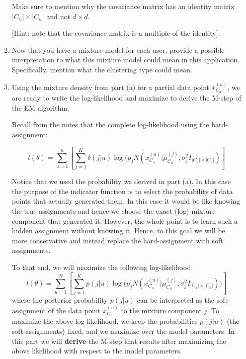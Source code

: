 \begin{enumerate}
\begin{enumerate}
Make sure to mention why the covariance matrix has an identity matrix $ |C_u| \times |C_u| $ and not $ d \times d $.
 
 [Hint: note that the covariance matrix is a multiple of the identity].

 
 \item Now that you have a mixture model for each user, provide a possible interpretation to what this mixture model could mean in this application. Specifically, mention what the clustering type could mean.

\item Using the mixture density from part (a) for a partial data point $x^{(u)}_{C_u}$, we are ready to write the log-likelihood and maximize to derive the M-step of the EM algorithm. 

\color{blue}
Recall from the notes that the complete log-likelihood using the hard-assignment:

$$ l(\theta) = \sum^n_{u=1} \left[ \sum^{K}_{j=1} \delta(j|u) \log( p_j N(x^{(u)}_{C_u} | \mu^{(j)}_{C_u}, \sigma^2_j I_{|C_u| \times |C_u|}) \right]$$

Notice that we used the probability we derived in part (a). In this case the purpose of the indicator function is to select the probability of data points that actually generated them. In this case it would be like knowing the true assignments and hence we choose the exact (log) mixture component that generated it. However, the whole point is to learn such a hidden assignment without knowing it. Hence, to this goal we will be more conservative and instead replace the hard-assignment with soft assignments.
\color{black}

To that end, we will maximize the following log-likelihood:
$$ l(\theta) = \sum_{u=1}^N \left[ \sum^{K}_{j=1} p(j|u) \log\bigl( p_j N(x^{(u)}_{C_u} | \mu^{(j)}_{C_u}, \sigma^2_j I_{|C_u| \times |C_u|} ) \bigr) \right]$$
where the posterior probability $p(j|u)$ can be interpreted as the soft-assignment of the data point $x^{(u)}_{C_u}$ to the mixture component $j$. To maximize the above log-likelihood, we keep the probabilities $p(j|u)$ (the soft-assignments) fixed, and we maximize over the model parameters. In this part we will \textbf{derive} the M-step that results after maximizing the above likelihood with respect to the model parameters.


\end{enumerate}
\end{enumerate}
